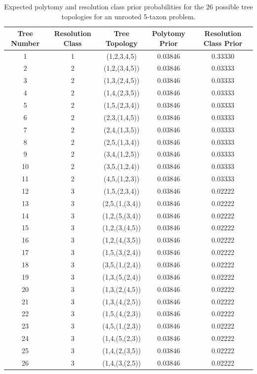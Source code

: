 \documentclass[10pt]{article}
\begin{document}
%
\begin{table}[h]
\caption{Expected polytomy and resolution class prior probabilities for the 26 possible tree topologies for an unrooted 5-taxon problem.}
\label{polytomyprior}
\begin{center}
\begin{tabular}{ccccc}
Tree Number & Resolution Class & Tree Topology & Polytomy Prior & Resolution Class Prior \\ \hline
1	 &   1	  	&  (1,2,3,4,5)	  	&    0.03846	&    0.33330 \\
2	 & 	 2		&  (1,2,(3,4,5))	& 	 0.03846	& 	 0.03333 \\
3	 & 	 2		&  (1,3,(2,4,5))	& 	 0.03846	& 	 0.03333 \\
4	 & 	 2		&  (1,4,(2,3,5))	& 	 0.03846	& 	 0.03333 \\
5	 & 	 2		&  (1,5,(2,3,4))	& 	 0.03846	& 	 0.03333 \\
6	 & 	 2		&  (2,3,(1,4,5))	& 	 0.03846	& 	 0.03333 \\
7	 & 	 2		&  (2,4,(1,3,5))	& 	 0.03846	& 	 0.03333 \\
8	 & 	 2		&  (2,5,(1,3,4))	& 	 0.03846	& 	 0.03333 \\
9	 & 	 2		&  (3,4,(1,2,5))	& 	 0.03846	& 	 0.03333 \\
10	 & 	 2		&  (3,5,(1,2,4))	& 	 0.03846	& 	 0.03333 \\
11	 & 	 2	  	&  (4,5,(1,2,3))	& 	 0.03846	&    0.03333 \\
12	 & 	 3		&  (1,5,(2,3,4))	& 	 0.03846	& 	 0.02222 \\
13   &   3		&  (2,5,(1,(3,4))	& 	 0.03846	& 	 0.02222 \\
14	 & 	 3		&  (1,2,(5,(3,4))	& 	 0.03846	& 	 0.02222 \\
15	 & 	 3		&  (1,2,(3,(4,5))	& 	 0.03846	& 	 0.02222 \\
16	 & 	 3		&  (1,2,(4,(3,5))	& 	 0.03846	& 	 0.02222 \\
17	 & 	 3		&  (1,5,(3,(2,4))	& 	 0.03846	& 	 0.02222 \\
18	 & 	 3		&  (3,5,(1,(2,4))	& 	 0.03846	& 	 0.02222 \\
19	 & 	 3		&  (1,3,(5,(2,4))	& 	 0.03846	& 	 0.02222 \\
20	 & 	 3		&  (1,3,(2,(4,5))	& 	 0.03846	& 	 0.02222 \\
21	 & 	 3		&  (1,3,(4,(2,5))	& 	 0.03846	& 	 0.02222 \\
22	 & 	 3		&  (1,5,(4,(2,3))	& 	 0.03846	& 	 0.02222 \\
23	 & 	 3		&  (4,5,(1,(2,3))	& 	 0.03846	& 	 0.02222 \\
24	 & 	 3		&  (1,4,(5,(2,3))	& 	 0.03846	& 	 0.02222 \\
25	 & 	 3		&  (1,4,(2,(3,5))	& 	 0.03846	& 	 0.02222 \\
26	 & 	 3	  	&  (1,4,(3,(2,5))	& 	 0.03846	&    0.02222 \\ \hline
\end{tabular}
\end{center}
\end{table}
\end{document}
